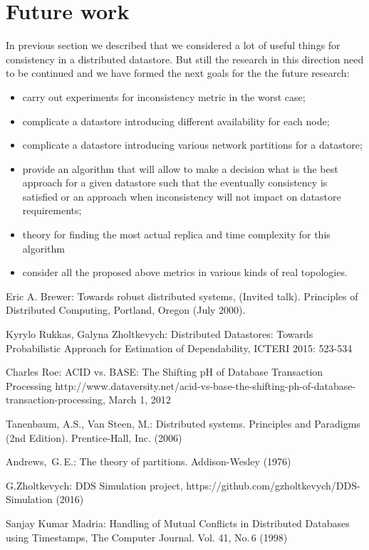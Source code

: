 \documentclass{llncs}
\begin{document}
\section{Future work}


In previous section we described that we considered a lot of useful things for consistency in a distributed datastore. But still the research in this direction need to be continued and we have formed the next goals for the the future research:

\begin{itemize}

\item carry out experiments for inconsistency metric in the worst case;

\item complicate a datastore introducing different availability for each node;

\item complicate a datastore introducing various network partitions for a datastore;

\item provide an algorithm that will allow to make a decision what is the best approach for a given datastore such that the eventually consistency is satisfied or an approach when inconsistency will not impact on datastore requirements;

\item theory for finding the most actual replica and time complexity for this algorithm

\item consider all the proposed above metrics in various kinds of real topologies.
\end{itemize}





\begin{thebibliography}{00}


Eric A. Brewer:
Towards robust distributed systems,
(Invited talk). Principles of Distributed Computing, Portland, Oregon (July 2000).

Kyrylo Rukkas, Galyna Zholtkevych:
Distributed Datastores: Towards Probabilistic Approach for Estimation of Dependability,
ICTERI 2015: 523-534

Charles Roe:
ACID vs. BASE: The Shifting pH of Database Transaction Processing
http://www.dataversity.net/acid-vs-base-the-shifting-ph-of-database-transaction-processing, March 1, 2012

Tanenbaum, A.S., Van Steen, M.:
Distributed systems. Principles and Paradigms (2nd Edition).
Prentice-Hall, Inc. (2006)

Andrews,~G.\,E.:
The theory of partitions.
Addison-Wesley (1976)


G.Zholtkevych: 
DDS Simulation project,
https://github.com/gzholtkevych/DDS-Simulation (2016) 

Sanjay Kumar Madria: 
Handling of Mutual Conflicts in Distributed Databases using Timestamps,
The Computer Journal. Vol. 41, No.\,6 (1998) 

\end{thebibliography}
\end{document}
